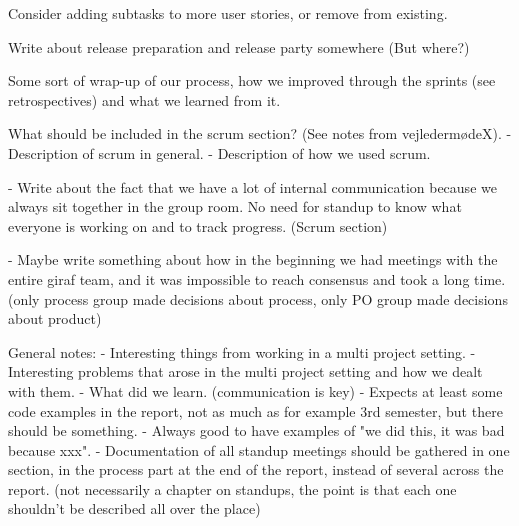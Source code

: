 Consider adding subtasks to more user stories, or remove from existing.

Write about release preparation and release party somewhere (But where?)

Some sort of wrap-up of our process, how we improved through the sprints (see retrospectives) and what we learned from it.

What should be included in the scrum section? (See notes from vejledermødeX).
- Description of scrum in general.
- Description of how we used scrum.

- Write about the fact that we have a lot of internal communication because we always sit together in the group room. No need for standup to know what everyone is working on	and to track progress. (Scrum section)

- Maybe write something about how in the beginning we had meetings with the entire giraf team, and it was impossible to reach consensus and took a long time. (only process group made decisions about process, only PO group made decisions about product)

General notes:
- Interesting things from working in a multi project setting.
- Interesting problems that arose in the multi project setting and how we dealt with them.
- What did we learn. (communication is key)
- Expects at least some code examples in the report, not as much as for example 3rd semester, but there should be something.
- Always good to have examples of "we did this, it was bad because xxx".
- Documentation of all standup meetings should be gathered in one section, in the process part at the end of the report, instead of several across the report. (not necessarily a chapter on standups, the point is that each one shouldn't be described all over the place)


